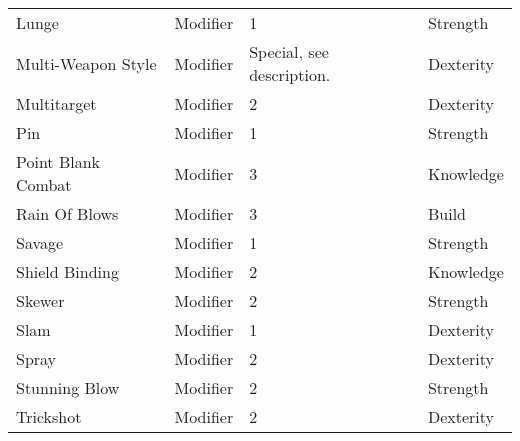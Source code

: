 \documentclass[twoside]{book}
\begin{document}
\begin{longtable}{p{1.25in}lll}
  \raggedright
           Lunge 
  &
   Modifier 
  &
   1 
  &
   Strength 
  \tabularnewline
      
  \raggedright
           Multi-Weapon Style 
  &
   Modifier 
  &
   Special, see
           description. 
  &
   Dexterity 
  \tabularnewline
      
  \raggedright
           Multitarget 
  &
   Modifier 
  &
   2 
  &
   Dexterity 
  \tabularnewline
      
  \raggedright
           Pin 
  &
   Modifier 
  &
   1 
  &
   Strength 
  \tabularnewline
      
  \raggedright
           Point Blank Combat 
  &
   Modifier 
  &
   3 
  &
   Knowledge 
  \tabularnewline
      
  \raggedright
           Rain Of Blows 
  &
   Modifier 
  &
   3 
  &
   Build 
  \tabularnewline
      
  \raggedright
           Savage 
  &
   Modifier 
  &
   1 
  &
   Strength 
  \tabularnewline
      
  \raggedright
           Shield Binding 
  &
   Modifier 
  &
   2 
  &
   Knowledge 
  \tabularnewline
      
  \raggedright
           Skewer 
  &
   Modifier 
  &
   2 
  &
   Strength 
  \tabularnewline
      
  \raggedright
           Slam 
  &
   Modifier 
  &
   1 
  &
   Dexterity 
  \tabularnewline
      
  \raggedright
           Spray 
  &
   Modifier 
  &
   2 
  &
   Dexterity 
  \tabularnewline
      
  \raggedright
           Stunning Blow 
  &
   Modifier 
  &
   2 
  &
   Strength 
  \tabularnewline
      
  \raggedright
           Trickshot 
  &
   Modifier 
  &
   2 
  &
   Dexterity 
  \tabularnewline
      
\end{longtable}
    
\end{document}

